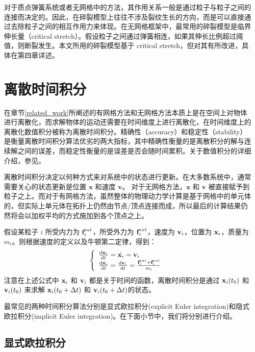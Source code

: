 对于质点弹簧系统或者无网格中的方法，其作用关系一般是通过粒子与粒子之间的连接而决定的。因此，在碎裂模型上往往不涉及裂纹生长的方向，而是可以直接通过去除粒子之间的相互作用力来体现。在无网格框架中，最常用的碎裂模型是临界伸长量（critical stretch）。假设粒子之间通过弹簧相连，如果其伸长比例超过阈值，则断裂发生。本文所用的碎裂模型基于 critical stretch，但对其有所改进，具体在第四章详述。

\section{离散时间积分}
\label{numerical_method}
在章节\ref{related_work}所阐述的有网格方法和无网格方法本质上是在空间上对物体进行离散化，而求解物体的运动还需要在时间维度上进行离散化，在时间维度上的离散化数值积分被称为离散时间积分。精确性（accuracy）和稳定性（stability）是衡量离散时间积分算法优劣的两大指标，其中精确性衡量的是离散积分的解与连续解之间的误差，而稳定性衡量的是误差是否会随时间累积。关于数值积分的详细介绍，参见。

离散时间积分决定以何种方式来对系统中的状态进行更新。在大多数系统中，通常需要关心的状态更新是位置 $\textbf{x}$ 和速度 $\textbf{v}$。 对于无网格方法，$\textbf{x}$ 和 $\textbf{v}$ 被直接赋予到粒子之上。而对于有网格方法，虽然整体的物理动力学计算是基于网格中的单元体的，但实际上单元体在拓扑上仍然由节点/顶点连接而成，所以最后的计算结果仍然将会以加权平均的方式施加到各个顶点之上。

假设某粒子 $i$ 所受内力为 $\textbf{f}_i^{int}$，所受外力为 $\textbf{f}_i^{ext}$，速度为 $\textbf{v}_i$，位置为 $\textbf{x}_i$，质量为 $m_i$。则根据速度的定义以及牛顿第二定律，得到：
\begin{equation}
\label{eq1}
\left\{ \begin{array}{l}
\frac{\textrm{d}\textbf{x}_i}{\textrm{d}t} = \dot{\textbf{x}_i}=\textbf{v}_i\\
\frac{\textrm{d}\dot{\textbf{x}_i}}{\textrm{d}t} = \frac{\textrm{d}\textbf{v}_i}{\textrm{d}t}=\frac{\textbf{f}_i^{int} + \textbf{f}_i^{ext}}{m_i}
\end{array} \right.
\end{equation}
注意在上述公式中 $\textbf{x}_i$ 和 $\textbf{v}_i$ 都是关于时间的函数，离散时间积分是通过 $\textbf{x}_i(t_0)$ 和 $\textbf{v}_i(t_0)$ 来求解 $\textbf{x}_i(t_0 + \Delta t)$ 和 $\textbf{v}_i(t_0 + \Delta t)$的状态。

最常见的两种时间积分算法分别是显式欧拉积分(explicit Euler integration)和隐式欧拉积分(implicit Euler integration)。在下面小节中，我们将分别进行介绍。

\subsection{显式欧拉积分}
\label{explicit_euler_method}

